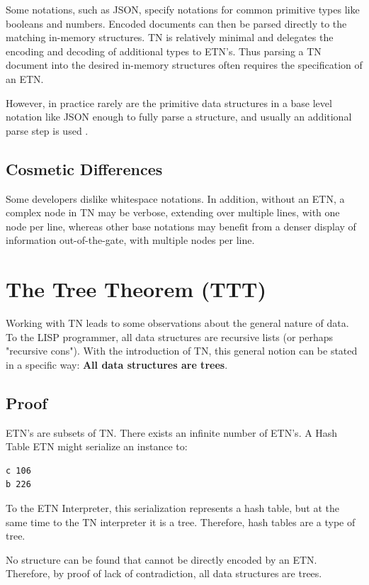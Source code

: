 \documentclass[journal]{IEEEtran}
\begin{document}
Some notations, such as JSON, specify notations for common primitive types like booleans and numbers. Encoded documents can then be parsed directly to the matching in-memory structures. TN is relatively minimal and delegates the encoding and decoding of additional types to ETN's. Thus parsing a TN document into the desired in-memory structures often requires the specification of an ETN.

However, in practice rarely are the primitive data structures in a base level notation like JSON enough to fully parse a structure, and usually an additional parse step is used  \cite{Ooms}.

\subsection{Cosmetic Differences}

Some developers dislike whitespace notations. In addition, without an ETN, a complex node in TN may be verbose, extending over multiple lines, with one node per line, whereas other base notations may benefit from a denser display of information out-of-the-gate, with multiple nodes per line.

\section{The Tree Theorem (TTT)}

Working with TN leads to some observations about the general nature of data. To the LISP programmer, all data structures are recursive lists (or perhaps "recursive cons"). With the introduction of TN, this general notion can be stated in a specific way: \textbf{All data structures are trees}.

\subsection{Proof}

ETN's are subsets of TN. There exists an infinite number of ETN's. A Hash Table ETN might serialize an instance to:

\begin{lstlisting}
c 106
b 226
\end{lstlisting}

To the ETN Interpreter, this serialization represents a hash table, but at the same time to the TN interpreter it is a tree. Therefore, hash tables are a type of tree.

No structure can be found that cannot be directly encoded by an ETN. Therefore, by proof of lack of contradiction, all data structures are trees.
\end{document}
